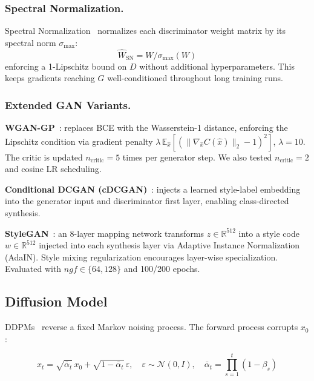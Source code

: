 \documentclass[runningheads]{llncs}
\begin{document}
\subsubsection{Spectral Normalization.}

Spectral Normalization~\cite{miyato2018} normalizes each discriminator weight matrix by its spectral norm $\sigma_{\max}$:
\begin{equation}
\hat{W}_\text{SN} = W / \sigma_{\max}(W)
\end{equation}
enforcing a 1-Lipschitz bound on $D$ without additional hyperparameters. This keeps gradients reaching $G$ well-conditioned throughout long training runs.

\subsubsection{Extended GAN Variants.}\label{sec:gan_extensions}

\noindent\textbf{WGAN-GP}~\cite{gulrajani2017}: replaces BCE with the Wasserstein-1 distance, enforcing the Lipschitz condition via gradient penalty $\lambda\,\mathbb{E}_{\hat{x}}\!\left[(\|\nabla_{\hat{x}} C(\hat{x})\|_2-1)^2\right]$, $\lambda=10$. The critic is updated $n_\text{critic}=5$ times per generator step. We also tested $n_\text{critic}=2$ and cosine LR scheduling.

\noindent\textbf{Conditional DCGAN (cDCGAN)}~\cite{sohn2015}: injects a learned style-label embedding into the generator input and discriminator first layer, enabling class-directed synthesis.

\noindent\textbf{StyleGAN}~\cite{karras2018}: an 8-layer mapping network transforms $z \in \mathbb{R}^{512}$ into a style code $w \in \mathbb{R}^{512}$ injected into each synthesis layer via Adaptive Instance Normalization (AdaIN). Style mixing regularization encourages layer-wise specialization. Evaluated with $\mathit{ngf} \in \{64, 128\}$ and 100/200 epochs.

\subsection{Diffusion Model}\label{sec:diffusion}

DDPMs~\cite{ho2020} reverse a fixed Markov noising process. The forward process corrupts $x_0$:

\begin{equation}
x_t = \sqrt{\bar{\alpha}_t}\,x_0 + \sqrt{1-\bar{\alpha}_t}\,\varepsilon,\quad \varepsilon \sim \mathcal{N}(0,I),\quad \bar{\alpha}_t = \prod_{s=1}^{t}(1-\beta_s)
\end{equation}
\end{document}
